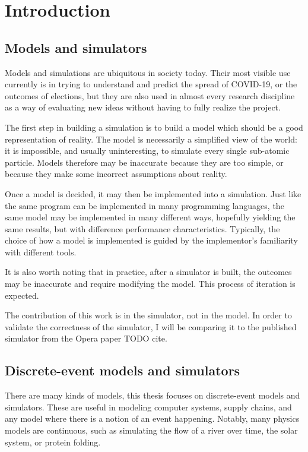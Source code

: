 \chapter{Introduction} \label{intro}


\section{Models and simulators} \label{models-and-sims}

Models and simulations are ubiquitous in society today.
Their most visible use currently is in trying to understand and predict the spread of COVID-19, or the outcomes of elections, but they are also used in almost every research discipline as a way of evaluating new ideas without having to fully realize the project.

The first step in building a simulation is to build a model which should be a good representation of reality.
The model is necessarily a simplified view of the world: it is impossible, and usually uninteresting, to simulate every single sub-atomic particle.
Models therefore may be inaccurate because they are too simple, or because they make some incorrect assumptions about reality.

Once a model is decided, it may then be implemented into a simulation.
Just like the same program can be implemented in many programming languages, the same model may be implemented in many different ways, hopefully yielding the same results, but with difference performance characteristics.
Typically, the choice of how a model is implemented is guided by the implementor's familiarity with different tools.

It is also worth noting that in practice, after a simulator is built, the outcomes may be inaccurate and require modifying the model.
This process of iteration is expected.

The contribution of this work is in the simulator, not in the model.
In order to validate the correctness of the simulator, I will be comparing it to the published simulator from the Opera paper TODO cite. 

\section{Discrete-event models and simulators} \label{discrete-event-sims}

There are many kinds of models,  this thesis focuses on discrete-event models and simulators.
These are useful in modeling computer systems, supply chains, and any model where there is a notion of an event happening.
Notably, many physics models are continuous, such as simulating the flow of a river over time, the solar system, or protein folding.


